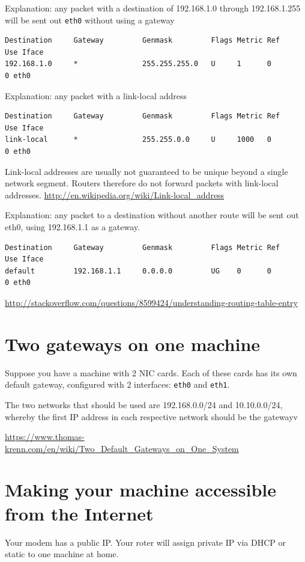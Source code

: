 Explanation:  any packet with a destination of 192.168.1.0 through 192.168.1.255
will be sent out \verb!eth0! without using a gateway
\begin{verbatim}
Destination     Gateway         Genmask         Flags Metric Ref    Use Iface
192.168.1.0     *               255.255.255.0   U     1      0        0 eth0
\end{verbatim}

Explanation: any packet with a link-local address
\begin{verbatim}
Destination     Gateway         Genmask         Flags Metric Ref    Use Iface
link-local      *               255.255.0.0     U     1000   0        0 eth0
\end{verbatim}
Link-local addresses are usually not guaranteed to be unique beyond a single
network segment. Routers therefore do not forward packets with link-local addresses.
\url{http://en.wikipedia.org/wiki/Link-local_address}

Explanation: any packet to a destination without another route will be sent out
eth0, using 192.168.1.1 as a gateway.
\begin{verbatim}
Destination     Gateway         Genmask         Flags Metric Ref    Use Iface
default         192.168.1.1     0.0.0.0         UG    0      0        0 eth0
\end{verbatim}
\url{http://stackoverflow.com/questions/8599424/understanding-routing-table-entry}

\section{Two gateways on one machine}

Suppose you have a machine with 2 NIC cards. Each of these cards has its own
default gateway, configured with 2 interfaces: \verb!eth0! and \verb!eth1!.

The two networks that should be used are 192.168.0.0/24 and 10.10.0.0/24,
whereby the first IP address in each respective network should be the gatewayv

\url{https://www.thomas-krenn.com/en/wiki/Two_Default_Gateways_on_One_System}


\section{Making your machine accessible from the Internet}
\label{sec:local_PC_accessible_via_Internet}


Your modem has a public IP. Your roter will assign private IP via DHCP or static
to one machine at home. 

